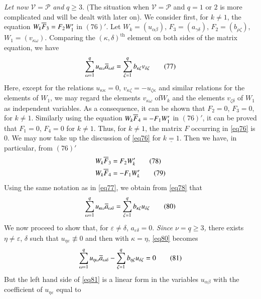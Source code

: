 {\em Let now} $\mathscr{V}=\mathscr{P}$ {\em and} $q\geq 3$. (The
situation when $\mathscr{V}=\mathscr{P}$ and $q=1$ or $2$ is more
complicated and will be dealt with later on). We consider first, for
$k\neq 1$, the equation $W_{k}\overline{F}_{3}=F_{2}W'_{1}$ in $(76)'$. Let
$W_{k}=(u_{\alpha\beta})$, $F_{3}=(a_{\gamma\delta})$,
$F_{2}=(b_{\rho\zeta})$, $W_{1}=(v_{\kappa \omega})$. Comparing the
$(\kappa, \delta)^{\text{th}}$ element on both sides of the matrix
equation, we have
\begin{equation*}
\sum^{q}_{\omega=1}u_{\kappa\omega}\overline{a}_{\omega\delta}=\sum^{q}_{\zeta=1}b_{\kappa\zeta}v_{\delta\zeta}\tag{77}\label{eq77}
\end{equation*}
Here, except for the relations $u_{\kappa\kappa}=0$,
$v_{\kappa\zeta}=-u_{\zeta\kappa}$ and similar relations for the
elements of $W_{1}$, we may regard the elements $v_{\kappa\omega}$ 
of\pageoriginale $W_{k}$ and the elements $v_{\zeta\delta}$ of $W_{1}$
as independent variables. As a consequence, it can be shown that
$F_{2}=0$, $F_{3}=0$, for $k\neq 1$. Similarly using the equation
$W_{k}\overline{F}_{4}=-F_{1}W'_{1}$ in $(76)'$, it can be proved that
$F_{1}=0$, $F_{4}=0$ for $k\neq 1$. Thus, for $k\neq 1$, the matrix
$F$ occurring in \eqref{eq76} is $0$. We may now take up the discussion
of \eqref{eq76} for $\underline{k=1}$. Then we have, in particular, from
$(76)'$
\begin{align*}
W_{k}\overline{F}_{3} &= F_{2}W'_{k}\tag{78}\label{eq78}\\
W_{k}\overline{F}_{4} &= -F_{1}W'_{k}\tag{79}\label{eq79}
\end{align*}
Using the same notation as in \eqref{eq77}, we obtain from \eqref{eq78}
that 
\begin{equation*}
\sum^{q}_{\omega=1}u_{\kappa\omega}\overline{a}_{\omega\delta}=
\sum^{q}_{\zeta=1}b_{\kappa\zeta}u_{\delta\zeta}\tag{80}\label{eq80}
\end{equation*}
We now proceed to show that, for $\varepsilon\neq \delta$,
$a_{\varepsilon\delta}=0$. {\em Since $\underline{\nu=q\geq 3}$,} there
exists $\eta\neq \varepsilon$, $\delta$ such that
$u_{\eta\varepsilon}\not\equiv 0$ and then with $\kappa=\eta$, 
\eqref{eq80} becomes
\begin{equation*}
\sum^{q}_{\omega=1}u_{\eta\omega}\overline{a}_{\omega\delta}-
\sum^{q}_{\zeta=1}b_{\eta\zeta}u_{\delta\zeta}=0\tag{81}\label{eq81} 
\end{equation*}
But the left hand side of \eqref{eq81} is a linear form in the variables
$u_{\alpha\beta}$ with the coefficient of $u_{\eta\varepsilon}$ equal to
